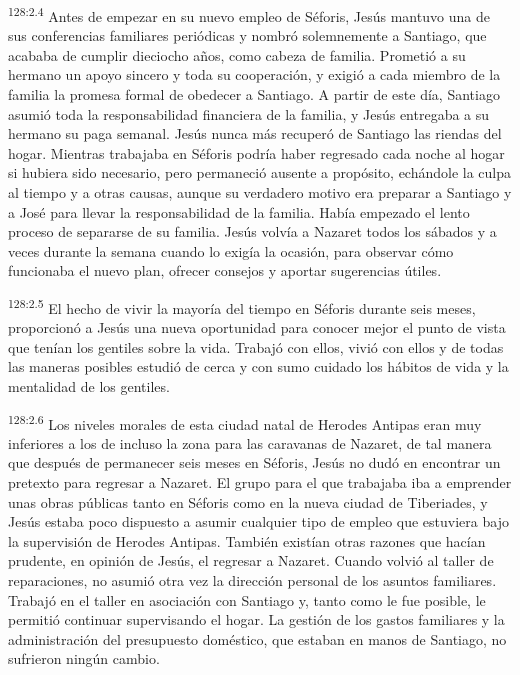 \par
\textsuperscript{128:2.4} Antes de empezar en su nuevo empleo de Séforis, Jesús mantuvo una de sus conferencias familiares periódicas y nombró solemnemente a Santiago, que acababa de cumplir dieciocho años, como cabeza de familia. Prometió a su hermano un apoyo sincero y toda su cooperación, y exigió a cada miembro de la familia la promesa formal de obedecer a Santiago. A partir de este día, Santiago asumió toda la responsabilidad financiera de la familia, y Jesús entregaba a su hermano su paga semanal. Jesús nunca más recuperó de Santiago las riendas del hogar. Mientras trabajaba en Séforis podría haber regresado cada noche al hogar si hubiera sido necesario, pero permaneció ausente a propósito, echándole la culpa al tiempo y a otras causas, aunque su verdadero motivo era preparar a Santiago y a José para llevar la responsabilidad de la familia. Había empezado el lento proceso de separarse de su familia. Jesús volvía a Nazaret todos los sábados y a veces durante la semana cuando lo exigía la ocasión, para observar cómo funcionaba el nuevo plan, ofrecer consejos y aportar sugerencias útiles.

\par
\textsuperscript{128:2.5} El hecho de vivir la mayoría del tiempo en Séforis durante seis meses, proporcionó a Jesús una nueva oportunidad para conocer mejor el punto de vista que tenían los gentiles sobre la vida. Trabajó con ellos, vivió con ellos y de todas las maneras posibles estudió de cerca y con sumo cuidado los hábitos de vida y la mentalidad de los gentiles.

\par
\textsuperscript{128:2.6} Los niveles morales de esta ciudad natal de Herodes Antipas eran muy inferiores a los de incluso la zona para las caravanas de Nazaret, de tal manera que después de permanecer seis meses en Séforis, Jesús no dudó en encontrar un pretexto para regresar a Nazaret. El grupo para el que trabajaba iba a emprender unas obras públicas tanto en Séforis como en la nueva ciudad de Tiberiades, y Jesús estaba poco dispuesto a asumir cualquier tipo de empleo que estuviera bajo la supervisión de Herodes Antipas. También existían otras razones que hacían prudente, en opinión de Jesús, el regresar a Nazaret. Cuando volvió al taller de reparaciones, no asumió otra vez la dirección personal de los asuntos familiares. Trabajó en el taller en asociación con Santiago y, tanto como le fue posible, le permitió continuar supervisando el hogar. La gestión de los gastos familiares y la administración del presupuesto doméstico, que estaban en manos de Santiago, no sufrieron ningún cambio.

